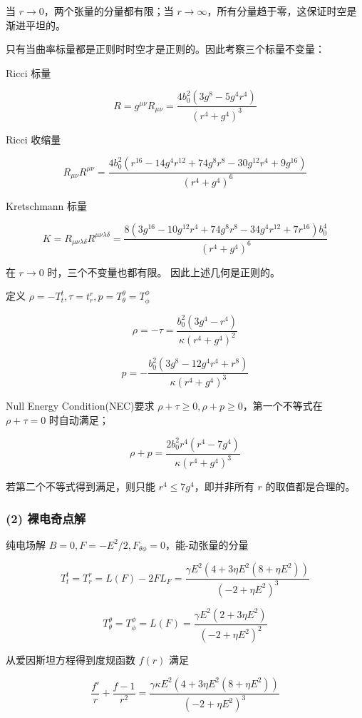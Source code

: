 \documentclass[aps,prl,preprint,groupedaddress,showkeys]{revtex4-2}
\begin{document}
当 $r\to 0 $，两个张量的分量都有限；当 $r\to \infty $，所有分量趋于零，这保证时空是渐进平坦的。

只有当曲率标量都是正则时时空才是正则的。因此考察三个标量不变量：
    
Ricci 标量

$$
R = g^{\mu\nu}R_{\mu\nu}
=\frac{4b_0^2\left(3g^8-5g^4r^4 \right) }{\left(r^4+g^4 \right)^3 }
$$

Ricci 收缩量

$$
R_{\mu\nu} R^{\mu\nu}
=\frac{4b_0^2 \left(r^{16}-14g^4r^{12}+74g^8r^8-30g^{12}r^4+9g^{16} \right) }{\left(r^4+g^4 \right)^6 }
$$

Kretschmann 标量

$$
K
=R_{\mu\nu\lambda\delta} R^{\mu\nu\lambda\delta}
=\frac{8\left(3g^{16}-10g^{12}r^4+74 g^8 r^8-34g^4r^{12}+7r^{16} \right)b_0^4 }{\left(r^4+g^4 \right)^6 }
$$

在 $r\to 0$ 时，三个不变量也都有限。 因此上述几何是正则的。

定义 $\rho=-T_t^t,\tau=t_r^r,p=T_\theta^\theta=T_\phi^\phi $

$$
\rho=-\tau
=\frac{b_0^2\left(3g^4-r^4 \right) }{\kappa \left(r^4+g^4 \right)^2 } 
$$

$$
p
=-\frac{b_0^2\left(3g^8-12g^4r^4+r^8 \right) }{\kappa \left(r^4+g^4 \right)^3 }
$$

Null Energy Condition(NEC)要求 $\rho+\tau \geq 0,\rho+p\geq 0 $，第一个不等式在 $\rho+\tau=0 $ 时自动满足；

$$
\rho+p
=\frac{2b_0^2 r^4\left(r^4-7g^4 \right) }{\kappa \left(r^4+g^4 \right)^3 }
$$

若第二个不等式得到满足，则只能 $r^4\leq 7g^4 $，即并非所有 $r$ 的取值都是合理的。

\subsubsection{(2) 裸电奇点解}

纯电场解 $B=0,F=-E^2/2,F_{\theta\phi}=0$，能-动张量的分量

$$
T_t^t = T_r^r
=L(F)-2F L_F 
=\frac{\gamma E^2\left(4+3\eta E^2\left(8+\eta E^2 \right) \right) }{\left(-2+\eta E^2 \right)^3 } 
$$

$$
T_\theta^\theta = T_\phi^\phi
=L(F)
=\frac{\gamma E^2\left(2+3\eta E^2 \right) }{\left(-2+\eta E^2 \right)^2 } 
$$

从爱因斯坦方程得到度规函数 $f(r)$ 满足

$$
\frac{f' }{r } + \frac{f-1 }{r^2 } = \frac{\gamma \kappa E^2 \left(4+3\eta E^2\left(8+\eta E^2 \right) \right) }{\left(-2+\eta E^2 \right)^3 }  
$$
\end{document}
